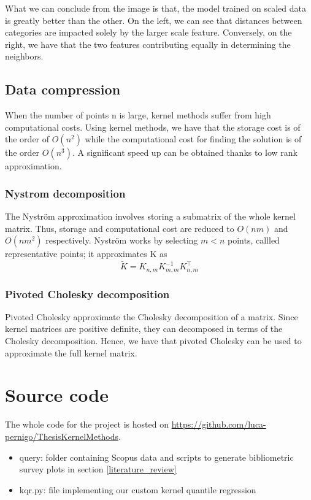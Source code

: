 What we can conclude from the image is that, the model trained on scaled data is greatly better than the other.
On the left, we can see that distances between categories are impacted solely by the larger scale feature. Conversely, on the right, we have that the two features contributing equally in determining the neighbors.

\subsection{Data compression}
When the number of points n is large, kernel methods suffer from high computational costs. 
Using kernel methods, we have that the storage cost is of the order of $O(n^2)$ while the computational cost for finding the solution is of the order $O(n^3)$.
A significant speed up can be obtained thanks to low rank approximation.


\subsubsection{Nystrom decomposition}
The Nyström approximation involves storing a submatrix of the whole kernel matrix. Thus, storage and computational cost are reduced to $O(nm)$ and $O(nm^2)$ respectively.
Nyström works by selecting $m<n$ points, callled representative points; it approximates K as
\begin{equation}
    \tilde {K}=K_{n,m} K_{m,m}^{-1}K_{n,m}^\intercal
\end{equation}


\subsubsection{Pivoted Cholesky decomposition}
Pivoted Cholesky approximate the Cholesky decomposition of a matrix. Since kernel matrices are positive definite, they can decomposed in terms of the Cholesky decomposition. Hence, we have that pivoted Cholesky can be used to approximate the full kernel matrix.


\newpage
\section{Source code}\label{src_code}
The whole code for the project is hosted on
\url{https://github.com/luca-pernigo/ThesisKernelMethods}\label{github_repo}.
\\
\begin{itemize}
    \item query: folder containing Scopus data and scripts to generate bibliometric survey plots in section \ref{literature_review}
    \item kqr.py: file implementing our custom kernel quantile regression
\end{itemize}
